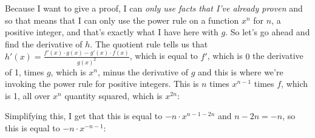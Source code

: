 \documentclass[pdftex, brazil, 12pt, twoside]{article}
\begin{document}
\begin{figure}[H]
  \begin{center}
  \end{center}
\end{figure}

Because I want to give a proof, I
can \emph{only use facts that I've already proven}
and so that means that I can only
use the power rule on a function $x^n$ for $n$, a positive integer,
and that's exactly what I have here with $g$.
So let's go ahead and find the derivative of $h$.
The quotient rule tells us that $\displaystyle h'(x) = \frac{f'(x) \cdot g(x) - g'(x) \cdot f(x)}{g(x)^2}$,
which is equal to $f'$, which
is $0$ the derivative of 1, times $g$, which is $x^n$,
minus the derivative of $g$ and this
is where we're invoking the power
rule for positive integers.
This is $n$ times $x^{n-1}$ times
$f$, which is 1, all over $x^n$ quantity
squared, which is $x^{2n}$:

\begin{figure}[H]
  \begin{center}
  \end{center}
\end{figure}

Simplifying this, I get that this
is equal to $-n \cdot x^{n - 1 - 2n}$ and $n - 2n = -n$,
so this is equal to $-n \cdot x^{-n - 1}$:
\end{document}
